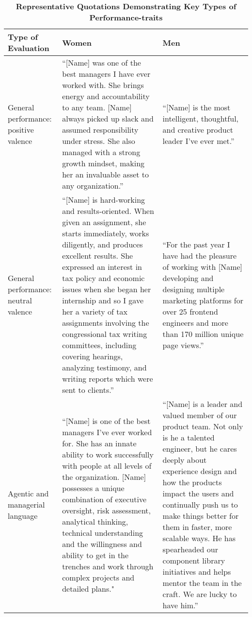 \documentclass[12pt]{caltech_thesis}
\begin{document}
 \begin{table}[htbp]
   \centering
   \small
   \caption{\textbf{Representative Quotations Demonstrating Key Types of Performance-traits}}
   \label{tab:performance-traits}
   \begin{tabular}{|p{5cm}|p{6cm}|p{6cm}|}
       \hline
       \textbf{Type of Evaluation} & \textbf{Women} & \textbf{Men} \\
       \hline
       General performance: positive valence & “[Name] was one of the best managers I have ever worked with. She brings energy and accountability to any team. [Name] always picked up slack and assumed responsibility under stress. She also managed with a strong growth mindset, making her an invaluable asset to any organization.” & “[Name] is the most intelligent, thoughtful, and creative product leader I've ever met.” \\
       \hline
       General performance: neutral valence & “[Name] is hard-working and results-oriented. When given an assignment, she starts immediately, works diligently, and produces excellent results. She expressed an interest in tax policy and economic issues when she began her internship and so I gave her a variety of tax assignments involving the congressional tax writing committees, including covering hearings, analyzing testimony, and writing reports which were sent to clients.” & “For the past year I have had the pleasure of working with [Name] developing and designing multiple marketing platforms for over 25 frontend engineers and more than 170 million unique page views.” \\
       \hline
       Agentic and managerial language & “[Name] is one of the best managers I've ever worked for. She has an innate ability to work successfully with people at all levels of the organization. [Name] possesses a unique combination of executive oversight, risk assessment, analytical thinking, technical understanding and the willingness and ability to get in the trenches and work through complex projects and detailed plans." & “[Name] is a leader and valued member of our product team. Not only is he a talented engineer, but he cares deeply about experience design and how the products impact the users and continually push us to make things better for them in faster, more scalable ways. He has spearheaded our component library initiatives and helps mentor the team in the craft. We are lucky to have him.” \\
       \hline

\end{tabular}
\end{table}
\end{document}
